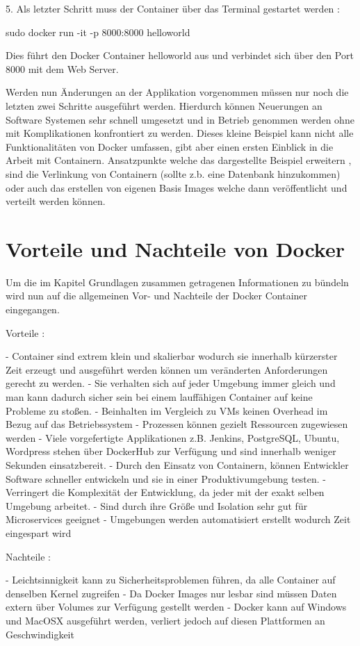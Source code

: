 \documentclass[12pt,toc=bib,toc=listof]{scrreprt}
\begin{document}
5. Als letzter Schritt muss der Container über das Terminal gestartet werden :

sudo docker run -it -p 8000:8000 helloworld

Dies führt den Docker Container helloworld aus und verbindet sich über den Port 8000 mit dem Web Server.

Werden nun Änderungen an der Applikation vorgenommen müssen nur noch die letzten zwei Schritte ausgeführt werden.
Hierdurch können Neuerungen an Software Systemen sehr schnell umgesetzt und in Betrieb genommen werden ohne mit Komplikationen konfrontiert zu werden.
Dieses kleine Beispiel kann nicht alle Funktionalitäten von Docker umfassen, gibt aber einen ersten Einblick in die Arbeit mit Containern.
Ansatzpunkte welche das dargestellte Beispiel erweitern , sind die Verlinkung von Containern (sollte z.b. eine Datenbank hinzukommen) oder auch das erstellen von eigenen Basis Images welche dann veröffentlicht und verteilt werden können.

\section{Vorteile und Nachteile von Docker}
Um die im Kapitel Grundlagen zusammen getragenen Informationen zu bündeln wird nun auf die allgemeinen Vor- und Nachteile der Docker Container eingegangen.

Vorteile :

- Container sind extrem klein und skalierbar wodurch sie innerhalb kürzerster Zeit erzeugt und ausgeführt werden können um veränderten Anforderungen gerecht zu werden.
- Sie verhalten sich auf jeder Umgebung immer gleich und man kann dadurch sicher sein bei einem lauffähigen Container auf keine Probleme zu stoßen.
- Beinhalten im Vergleich zu VMs keinen Overhead im Bezug auf das Betriebssystem
- Prozessen können gezielt Ressourcen zugewiesen werden
- Viele vorgefertigte Applikationen z.B. Jenkins, PostgreSQL, Ubuntu, Wordpress stehen über DockerHub zur Verfügung und sind innerhalb weniger Sekunden einsatzbereit.
- Durch den Einsatz von Containern, können Entwickler Software schneller entwickeln und sie in einer Produktivumgebung testen.
- Verringert die Komplexität der Entwicklung, da jeder mit der exakt selben Umgebung arbeitet.
- Sind durch ihre Größe und Isolation sehr gut für Microservices geeignet 
- Umgebungen werden automatisiert erstellt wodurch Zeit eingespart wird

Nachteile :

- Leichtsinnigkeit kann zu Sicherheitsproblemen führen, da alle Container auf denselben Kernel zugreifen
- Da Docker Images nur lesbar sind müssen Daten extern über Volumes zur Verfügung gestellt werden
- Docker kann auf Windows und MacOSX ausgeführt werden, verliert jedoch auf diesen Plattformen an Geschwindigkeit
\end{document}
